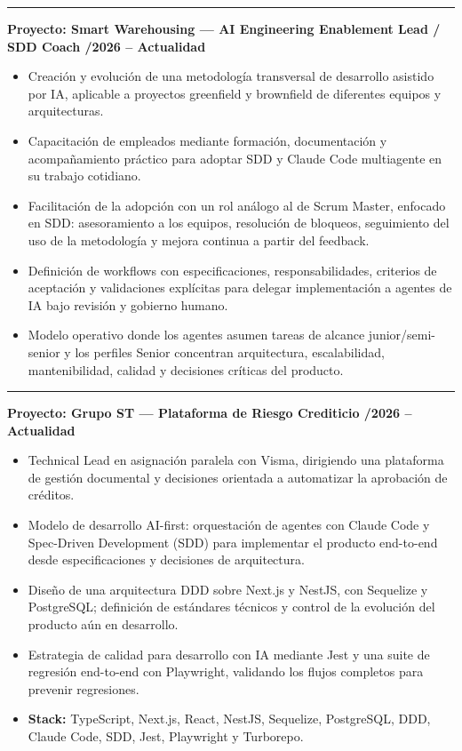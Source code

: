 \documentclass[11pt,letterpaper]{article}
\newcommand{\project}[1]{%
  \Needspace{6\baselineskip}%
  \vspace{0.3em}%
  {\color{accent}\rule[0.18em]{0.45em}{0.45em}}\hspace{0.4em}%
  \textbf{\color{accentdark}Proyecto: #1}\par
}
\begin{document}
\project{Smart Warehousing --- AI Engineering Enablement Lead / SDD Coach
  \textnormal{\small\textcolor{muted}{\enspace 09/2026 -- Actualidad}}}
\begin{itemize}
  \item Creación y evolución de una metodología transversal de desarrollo asistido por IA,
    aplicable a proyectos greenfield y brownfield de diferentes equipos y arquitecturas.
  \item Capacitación de empleados mediante formación, documentación y acompañamiento
    práctico para adoptar SDD y Claude Code multiagente en su trabajo cotidiano.
  \item Facilitación de la adopción con un rol análogo al de Scrum Master, enfocado en SDD:
    asesoramiento a los equipos, resolución de bloqueos, seguimiento del uso de la
    metodología y mejora continua a partir del feedback.
  \item Definición de workflows con especificaciones, responsabilidades, criterios de
    aceptación y validaciones explícitas para delegar implementación a agentes de IA bajo
    revisión y gobierno humano.
  \item Modelo operativo donde los agentes asumen tareas de alcance junior/semi-senior y
    los perfiles Senior concentran arquitectura, escalabilidad, mantenibilidad, calidad y
    decisiones críticas del producto.
\end{itemize}

\project{Grupo ST --- Plataforma de Riesgo Crediticio
  \textnormal{\small\textcolor{muted}{\enspace 08/2026 -- Actualidad}}}
\begin{itemize}
  \item Technical Lead en asignación paralela con Visma, dirigiendo una plataforma de
    gestión documental y decisiones orientada a automatizar la aprobación de créditos.
  \item Modelo de desarrollo AI-first: orquestación de agentes con Claude Code y
    Spec-Driven Development (SDD) para implementar el producto end-to-end desde
    especificaciones y decisiones de arquitectura.
  \item Diseño de una arquitectura DDD sobre Next.js y NestJS, con Sequelize y PostgreSQL;
    definición de estándares técnicos y control de la evolución del producto aún en desarrollo.
  \item Estrategia de calidad para desarrollo con IA mediante Jest y una suite de regresión
    end-to-end con Playwright, validando los flujos completos para prevenir regresiones.
  \item \textbf{Stack:} TypeScript, Next.js, React, NestJS, Sequelize, PostgreSQL, DDD,
    Claude Code, SDD, Jest, Playwright y Turborepo.
\end{itemize}
\end{document}
